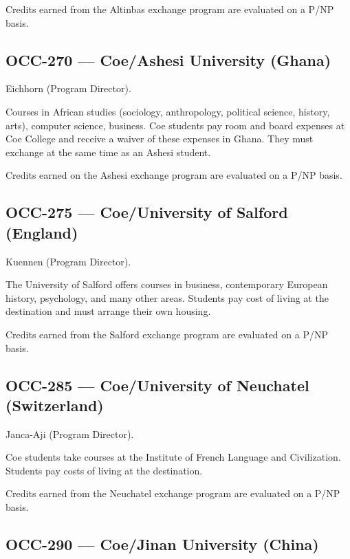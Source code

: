 \documentclass[
  letterpaper,
]{scrbook}
\begin{document}
Credits earned from the Altinbas exchange program are evaluated on a
P/NP basis.

\subsection{OCC-270 --- Coe/Ashesi University
(Ghana)}\label{occ-270-coeashesi-university-ghana}

Eichhorn (Program Director).

Courses in African studies (sociology, anthropology, political science,
history, arts), computer science, business. Coe students pay room and
board expenses at Coe College and receive a waiver of these expenses in
Ghana. They must exchange at the same time as an Ashesi student.

Credits earned on the Ashesi exchange program are evaluated on a P/NP
basis.

\subsection{OCC-275 --- Coe/University of Salford
(England)}\label{occ-275-coeuniversity-of-salford-england}

Kuennen (Program Director).

The University of Salford offers courses in business, contemporary
European history, psychology, and many other areas. Students pay cost of
living at the destination and must arrange their own housing.

Credits earned from the Salford exchange program are evaluated on a P/NP
basis.

\subsection{OCC-285 --- Coe/University of Neuchatel
(Switzerland)}\label{occ-285-coeuniversity-of-neuchatel-switzerland}

Janca-Aji (Program Director).

Coe students take courses at the Institute of French Language and
Civilization. Students pay costs of living at the destination.

Credits earned from the Neuchatel exchange program are evaluated on a
P/NP basis.

\subsection{OCC-290 --- Coe/Jinan University
(China)}\label{occ-290-coejinan-university-china}
\end{document}
